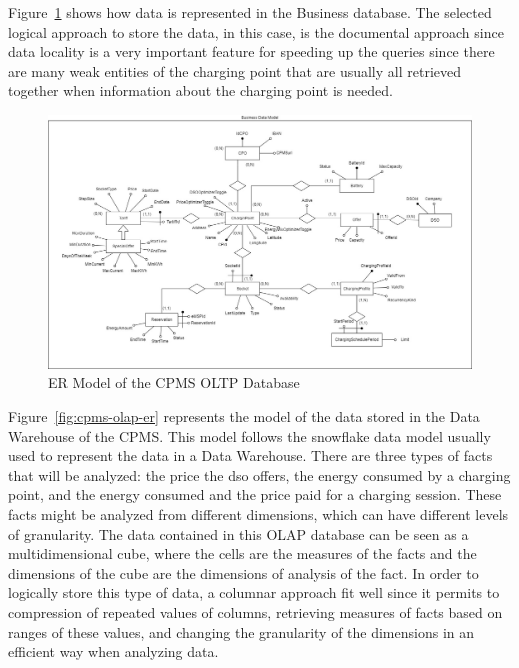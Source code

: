 \documentclass{Configuration_Files/PoliMi3i_thesis}
\begin{document}
Figure~\ref{fig:cpms-business-er} shows how data is represented in the Business database. The selected logical approach to store the data, in this case, is the documental approach since data locality is a very important feature for speeding up the queries since there are many weak entities of the charging point that are usually all retrieved together when information about the charging point is needed.

\begin{figure}[H]
    \centering
    \includegraphics[width=1\textwidth]{Images/er-models/business_data_model.jpg}
    \caption{ER Model of the CPMS OLTP Database}
    \label{fig:cpms-business-er}
\end{figure}

Figure~\ref{fig:cpms-olap-er} represents the model of the data stored in the Data Warehouse of the CPMS. This model follows the snowflake data model usually used to represent the data in a Data Warehouse. There are three types of facts that will be analyzed: the price the dso offers, the energy consumed by a charging point, and the energy consumed and the price paid for a charging session. These facts might be analyzed from different dimensions, which can have different levels of granularity. The data contained in this OLAP database can be seen as a multidimensional cube, where the cells are the measures of the facts and the dimensions of the cube are the dimensions of analysis of the fact. In order to logically store this type of data, a columnar approach fit well since it permits to compression of repeated values of columns, retrieving measures of facts based on ranges of these values, and changing the granularity of the dimensions in an efficient way when analyzing data.
\end{document}
